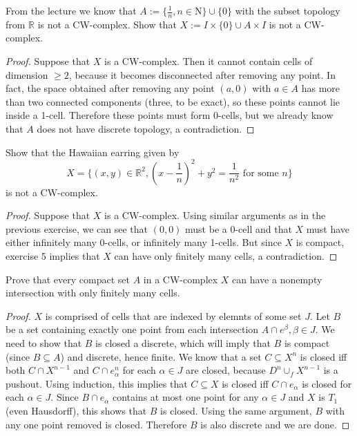 \documentclass[12pt,a4paper]{article}
\newcommand{\R}{\mathbb{R}}
\newcommand{\N}{\mathrm{N}}
\begin{document}
\ex From the lecture we know that $A:=\{\frac{1}{n},n\in\N\}\cup\{0\}$ with the subset topology from $\R$ is not a CW-complex. Show that $X:=I\times\{0\}\cup A\times I$ is not a CW-complex.
\begin{proof}
Suppose that $X$ is a CW-complex. Then it cannot contain cells of dimension $\geq 2$, because it becomes disconnected after removing any point. In fact, the space obtained after removing any point $(a,0)$ with $a\in A$ has more than two connected components (three, to be exact), so these points cannot lie inside a 1-cell. Therefore these points must form 0-cells, but we already know that $A$ does not have discrete topology, a contradiction.
\end{proof}

\ex Show that the Hawaiian earring given by $$X=\{(x,y)\in\R^2,(x-\frac{1}{n})^2+y^2=\frac{1}{n^2} \text{ for some } n\}$$ is not a CW-complex.
\begin{proof}
Suppose that $X$ is a CW-complex. Using similar arguments as in the previous exercise, we can see that $(0,0)$ must be a 0-cell and that $X$ must have either infinitely many 0-cells, or infinitely many 1-cells. But since $X$ is compact, exercise 5 implies that $X$ can have only finitely many cells, a contradiction.
\end{proof}

\ex Prove that every compact set $A$ in a CW-complex $X$ can have a nonempty intersection with only finitely many cells.
\begin{proof}
$X$ is comprised of cells that are indexed by elemnts of some set $J$. Let $B$ be a set containing exactly one point from each intersection $A\cap e^{\beta}, \beta\in J$. We need to show that $B$ is closed a discrete, which will imply that $B$ is compact (since $B\subseteq A$) and discrete, hence finite. We know that a set $C\subseteq X^{n}$ is closed iff both $C\cap X^{n-1}$ and $C\cap e_{\alpha}^n$ for each $\alpha\in J$ are closed, because $D^n\cup_f X^{n-1}$ is a pushout. Using induction, this implies that $C\subseteq X$ is closed iff $C\cap e_\alpha$ is closed for each $\alpha\in J$. Since $B\cap e_\alpha$ contains at most one point for any $\alpha\in J$ and $X$ is $T_1$ (even Hausdorff), this shows that $B$ is closed. Using the same argument, $B$ with any one point removed is closed. Therefore $B$ is also discrete and we are done.
\end{proof}
\end{document}
